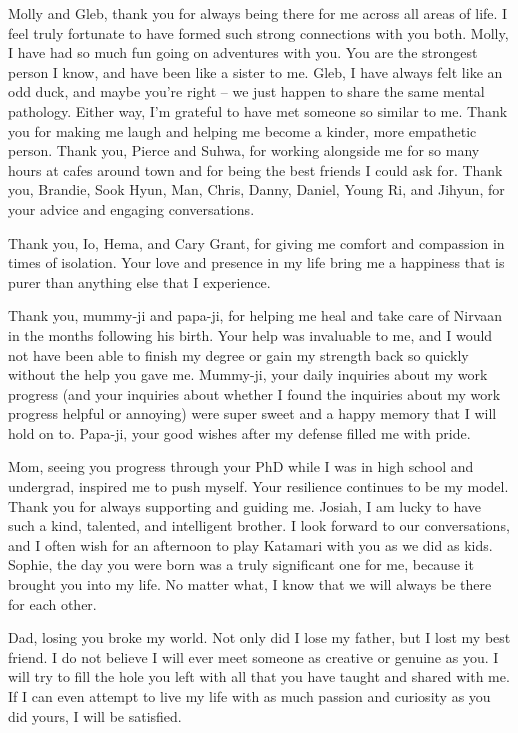 Molly and Gleb, thank you for always being there for me across all areas of life. I feel truly fortunate to have formed such strong connections with you both. Molly, I have had so much fun going on adventures with you. You are the strongest person I know, and have been like a sister to me. Gleb, I have always felt like an odd duck, and maybe you're right -- we just happen to share the same mental pathology. Either way, I'm grateful to have met someone so similar to me. Thank you for making me laugh and helping me become a kinder, more empathetic person. Thank you, Pierce and Suhwa, for working alongside me for so many hours at cafes around town and for being the best friends I could ask for. Thank you, Brandie, Sook Hyun, Man, Chris, Danny, Daniel, Young Ri, and Jihyun, for your advice and engaging conversations.

Thank you, Io, Hema, and Cary Grant, for giving me comfort and compassion in times of isolation. Your love and presence in my life bring me a happiness that is purer than anything else that I experience. 

Thank you, mummy-ji and papa-ji, for helping me heal and take care of Nirvaan in the months following his birth. Your help was invaluable to me, and I would not have been able to finish my degree or gain my strength back so quickly without the help you gave me. Mummy-ji, your daily inquiries about my work progress (and your inquiries about whether I found the inquiries about my work progress helpful or annoying) were super sweet and a happy memory that I will hold on to. Papa-ji, your good wishes after my defense filled me with pride. 

Mom, seeing you progress through your PhD while I was in high school and undergrad, inspired me to push myself. Your resilience continues to be my model. Thank you for always supporting and guiding me. Josiah, I am lucky to have such a kind, talented, and intelligent brother. I look forward to our conversations, and I often wish for an afternoon to play Katamari with you as we did as kids. Sophie, the day you were born was a truly significant one for me, because it brought you into my life. No matter what, I know that we will always be there for each other.

Dad, losing you broke my world. Not only did I lose my father, but I lost my best friend. I do not believe I will ever meet someone as creative or genuine as you. I will try to fill the hole you left with all that you have taught and shared with me. If I can even attempt to live my life with as much passion and curiosity as you did yours, I will be satisfied. 


